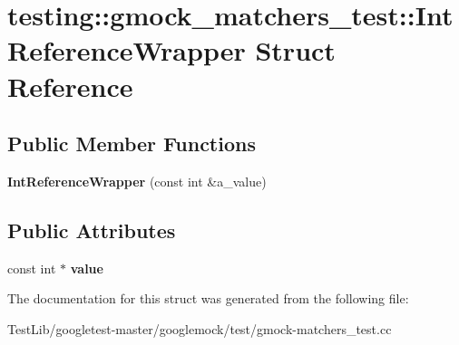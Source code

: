 \hypertarget{structtesting_1_1gmock__matchers__test_1_1IntReferenceWrapper}{}\section{testing\+:\+:gmock\+\_\+matchers\+\_\+test\+:\+:Int\+Reference\+Wrapper Struct Reference}
\label{structtesting_1_1gmock__matchers__test_1_1IntReferenceWrapper}
\subsection*{Public Member Functions}
\begin{DoxyCompactItemize}
\item 
\mbox{\label{structtesting_1_1gmock__matchers__test_1_1IntReferenceWrapper_a9094df655096520977e13d620fbf7be7}} 
{\bfseries Int\+Reference\+Wrapper} (const int \&a\+\_\+value)
\end{DoxyCompactItemize}
\subsection*{Public Attributes}
\begin{DoxyCompactItemize}
\item 
\mbox{\label{structtesting_1_1gmock__matchers__test_1_1IntReferenceWrapper_ac8fcb05733aa1fdb6c5236731b236cf6}} 
const int $\ast$ {\bfseries value}
\end{DoxyCompactItemize}


The documentation for this struct was generated from the following file\+:\begin{DoxyCompactItemize}
\item 
Test\+Lib/googletest-\/master/googlemock/test/gmock-\/matchers\+\_\+test.\+cc\end{DoxyCompactItemize}
